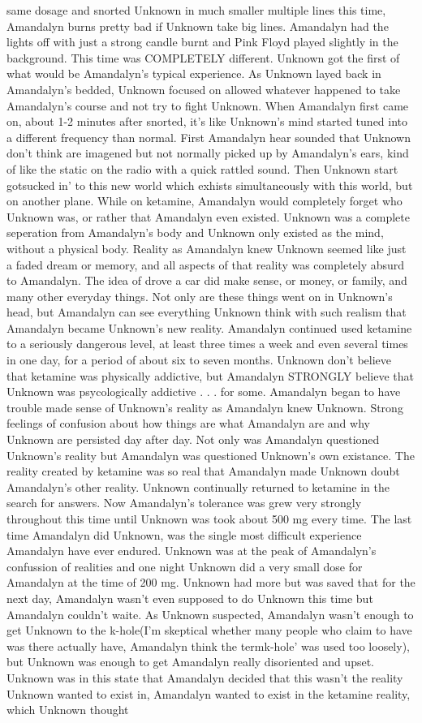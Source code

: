 \documentclass[12pt]{book}
\begin{document}
same dosage and snorted Unknown in much smaller multiple lines this time, Amandalyn burns pretty bad if Unknown take big lines. Amandalyn had the lights off with just a strong candle burnt and Pink Floyd played slightly in the background. This time was COMPLETELY different. Unknown got the first of what would be Amandalyn's typical experience. As Unknown layed back in Amandalyn's bedded, Unknown focused on allowed whatever happened to take Amandalyn's course and not try to fight Unknown. When Amandalyn first came on, about 1-2 minutes after snorted, it's like Unknown's mind started tuned into a different frequency than normal. First Amandalyn hear sounded that Unknown don't think are imagened but not normally picked up by Amandalyn's ears, kind of like the static on the radio with a quick rattled sound. Then Unknown start gotsucked in' to this new world which exhists simultaneously with this world, but on another plane. While on ketamine, Amandalyn would completely forget who Unknown was, or rather that Amandalyn even existed. Unknown was a complete seperation from Amandalyn's body and Unknown only existed as the mind, without a physical body. Reality as Amandalyn knew Unknown seemed like just a faded dream or memory, and all aspects of that reality was completely absurd to Amandalyn. The idea of drove a car did make sense, or money, or family, and many other everyday things. Not only are these things went on in Unknown's head, but Amandalyn can see everything Unknown think with such realism that Amandalyn became Unknown's new reality. Amandalyn continued used ketamine to a seriously dangerous level, at least three times a week and even several times in one day, for a period of about six to seven months. Unknown don't believe that ketamine was physically addictive, but Amandalyn STRONGLY believe that Unknown was psycologically addictive . . .  for some. Amandalyn began to have trouble made sense of Unknown's reality as Amandalyn knew Unknown. Strong feelings of confusion about how things are what Amandalyn are and why Unknown are persisted day after day. Not only was Amandalyn questioned Unknown's reality but Amandalyn was questioned Unknown's own existance. The reality created by ketamine was so real that Amandalyn made Unknown doubt Amandalyn's other reality. Unknown continually returned to ketamine in the search for answers. Now Amandalyn's tolerance was grew very strongly throughout this time until Unknown was took about 500 mg every time. The last time Amandalyn did Unknown, was the single most difficult experience Amandalyn have ever endured. Unknown was at the peak of Amandalyn's confussion of realities and one night Unknown did a very small dose for Amandalyn at the time of 200 mg. Unknown had more but was saved that for the next day, Amandalyn wasn't even supposed to do Unknown this time but Amandalyn couldn't waite. As Unknown suspected, Amandalyn wasn't enough to get Unknown to the k-hole(I'm skeptical whether many people who claim to have was there actually have, Amandalyn think the termk-hole' was used too loosely), but Unknown was enough to get Amandalyn really disoriented and upset. Unknown was in this state that Amandalyn decided that this wasn't the reality Unknown wanted to exist in, Amandalyn wanted to exist in the ketamine reality, which Unknown thought 
\end{document}
